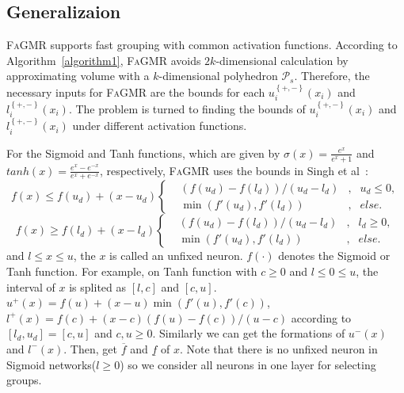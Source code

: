 \documentclass[runningheads]{llncs}
\newcommand{\ourtool}{\textsc{FaGMR}\xspace}
\begin{document}
\subsection{Generalizaion}\label{sec-generalization}
\ourtool supports fast grouping with common activation functions.
According to Algorithm~\ref{algorithm1},
\ourtool avoids $2k$-dimensional calculation
by approximating volume with a $k$-dimensional polyhedron $\mathcal{P}_{s}$.
Therefore, the necessary inputs for \ourtool are the
bounds for each $u^{\left\{+,- \right\}}_{i}(x_{i})$ and
$l^{\left\{+,- \right\}}_{i}(x_{i})$.
The problem is turned to finding the bounds of
$u^{\left\{+,- \right\}}_{i}(x_{i})$ and
$l^{\left\{+,- \right\}}_{i}(x_{i})$ under different activation functions.

For the Sigmoid and Tanh functions, which are given by $\sigma(x)=\frac{e^{x}}{e^{x}+1}$
and $tanh(x)=\frac{e^{x}-e^{-x}}{e^{x}+e^{-x}}$, respectively,
\ourtool uses the bounds in Singh et al~\cite{NEURIPS2018_f2f44698}:
\begin{equation*}
f(x) \leq f(u_{d}) + (x - u_{d})\left\{
\begin{aligned}
&(f(u_{d}) - f(l_{d}))/(u_{d} - l_{d}) & , & u_{d} \leq 0, \\
&\min(f'(u_{d}), f'(l_{d})) & , & else.
\end{aligned}
\right.
\end{equation*}
\begin{equation*}
f(x) \geq f(l_{d}) + (x - l_{d})\left\{
\begin{aligned}
&(f(u_{d}) - f(l_{d}))/(u_{d} - l_{d}) & , & l_{d} \geq 0, \\
&\min(f'(u_{d}), f'(l_{d})) & , & else.
\end{aligned}
\right.
\end{equation*}
and $l\leq x \leq u$, the $x$ is called an unfixed neuron. 
$f(\cdot)$ denotes the Sigmoid or Tanh function. 
For example, on Tanh function with $c \geq 0$ and $l \leq 0 \leq u$, the interval of $x$ 
is splited as $[l,c]$ and $[c, u]$. $u^{+}(x) = f(u)+(x-u)\min(f'(u),f'(c))$, 
$l^{+}(x) = f(c) + (x-c)(f(u)-f(c))/(u-c)$ 
according to $[l_{d},u_{d}]=[c,u]$ and $c,u \geq 0$. 
Similarly we can get the formations of $u^{-}(x)$ and $l^{-}(x)$. 
Then, get $\overline{f}$ and $\underline{f}$ of $x$. Note that there is no 
unfixed neuron in Sigmoid networks($l \geq 0$) so we consider all neurons in one layer for 
selecting groups.
\end{document}
